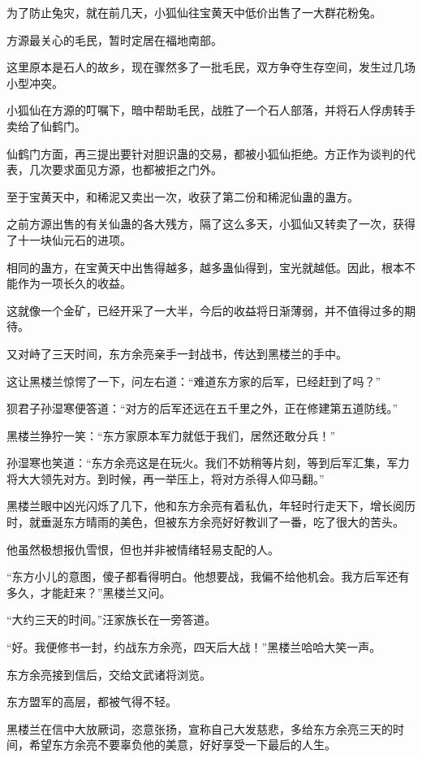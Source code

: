 \begin{this_body}
为了防止兔灾，就在前几天，小狐仙往宝黄天中低价出售了一大群花粉兔。

方源最关心的毛民，暂时定居在福地南部。

这里原本是石人的故乡，现在骤然多了一批毛民，双方争夺生存空间，发生过几场小型冲突。

小狐仙在方源的叮嘱下，暗中帮助毛民，战胜了一个石人部落，并将石人俘虏转手卖给了仙鹤门。

仙鹤门方面，再三提出要针对胆识蛊的交易，都被小狐仙拒绝。方正作为谈判的代表，几次要求面见方源，也都被拒之门外。

至于宝黄天中，和稀泥又卖出一次，收获了第二份和稀泥仙蛊的蛊方。

之前方源出售的有关仙蛊的各大残方，隔了这么多天，小狐仙又转卖了一次，获得了十一块仙元石的进项。

相同的蛊方，在宝黄天中出售得越多，越多蛊仙得到，宝光就越低。因此，根本不能作为一项长久的收益。

这就像一个金矿，已经开采了一大半，今后的收益将日渐薄弱，并不值得过多的期待。

又对峙了三天时间，东方余亮亲手一封战书，传达到黑楼兰的手中。

这让黑楼兰惊愕了一下，问左右道：“难道东方家的后军，已经赶到了吗？”

狈君子孙湿寒便答道：“对方的后军还远在五千里之外，正在修建第五道防线。”

黑楼兰狰狞一笑：“东方家原本军力就低于我们，居然还敢分兵！”

孙湿寒也笑道：“东方余亮这是在玩火。我们不妨稍等片刻，等到后军汇集，军力将大大领先对方。到时候，再一举压上，将对方杀得人仰马翻。”

黑楼兰眼中凶光闪烁了几下，他和东方余亮有着私仇，年轻时行走天下，增长阅历时，就垂涎东方晴雨的美色，但被东方余亮好好教训了一番，吃了很大的苦头。

他虽然极想报仇雪恨，但也并非被情绪轻易支配的人。

“东方小儿的意图，傻子都看得明白。他想要战，我偏不给他机会。我方后军还有多久，才能赶来？”黑楼兰又问。

“大约三天的时间。”汪家族长在一旁答道。

“好。我便修书一封，约战东方余亮，四天后大战！”黑楼兰哈哈大笑一声。

东方余亮接到信后，交给文武诸将浏览。

东方盟军的高层，都被气得不轻。

黑楼兰在信中大放厥词，恣意张扬，宣称自己大发慈悲，多给东方余亮三天的时间，希望东方余亮不要辜负他的美意，好好享受一下最后的人生。


\end{this_body}
